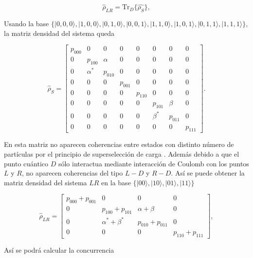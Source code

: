 \begin{appendixs}
\begin{equation*}
    \hat{\rho}_{LR} = \text{Tr}_{D}\{ \hat{\rho_{S}} \},
\end{equation*}

Usando la base $\{|0,0,0\rangle, |1,0,0\rangle, |0,1,0\rangle, |0,0,1\rangle, |1,1,0\rangle, |1,0,1\rangle, |0,1,1\rangle, |1,1,1\rangle\}$, la matriz densidad del sistema queda

\begin{equation}
    \hat{\rho}_{S} = 
    \begin{bmatrix}
        p_{000} & 0 & 0 & 0 & 0 & 0 & 0 & 0 \\
        0 & p_{100} & \alpha & 0 & 0 & 0 & 0 & 0 \\
        0 & \alpha^{*} & p_{010} & 0 & 0 & 0 & 0 & 0 \\
        0 & 0 & 0 & p_{001} & 0 & 0 & 0 & 0 \\
        0 & 0 & 0 & 0 & p_{110} & 0 & 0 & 0 \\
        0 & 0 & 0 & 0 & 0 & p_{101} & \beta & 0 \\
        0 & 0 & 0 & 0 & 0 & \beta^{*} & p_{011} & 0 \\
        0 & 0 & 0 & 0 & 0 & 0 & 0 & p_{111} 
        \end{bmatrix}.
        \label{appendix5rhoconcu}
\end{equation}

En esta matriz no aparecen coherencias entre estados con distinto número de partículas por el principio de superselección de carga \cite{bartlett2007reference,wick1997intrinsic}. Además debido a que el punto cuántico $D$ sólo interactua mediante interacción de Coulomb con los puntos $L$ y $R$, no aparecen coherencias del tipo $L-D$ y $R-D$. Así se puede obtener la matriz densidad del sistema $LR$ en la base $\{|00\rangle, |10\rangle, |01\rangle, |11\rangle \}$

\begin{equation*}
    \hat{\rho}_{LR} = 
    \begin{bmatrix}
        p_{000}+p_{001} & 0 & 0 & 0  \\
        0 & p_{100} + p_{101} & \alpha + \beta & 0  \\
        0 & \alpha^{*} +\beta^{*} & p_{010} + p_{011} & 0  \\
        0 & 0 & 0 & p_{110} + p_{111} 
        \end{bmatrix},
\end{equation*}

Así se podrá calcular la concurrencia 


\end{appendixs}
